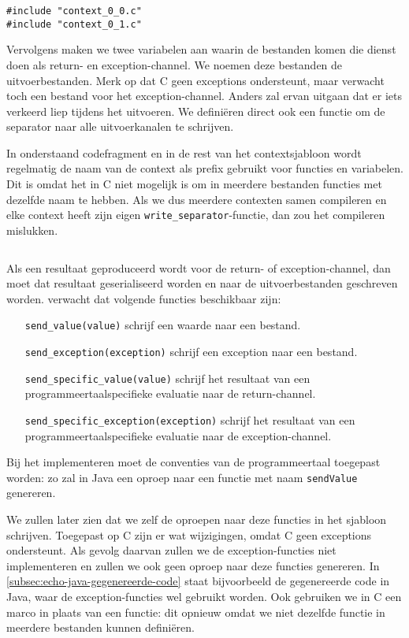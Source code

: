 \begin{verbatim}
#include "context_0_0.c"
#include "context_0_1.c"
\end{verbatim}

Vervolgens maken we twee variabelen aan waarin de bestanden komen die dienst doen als return- en exception-channel.
We noemen deze bestanden de uitvoerbestanden.
Merk op dat C geen exceptions ondersteunt, maar \tested{} verwacht toch een bestand voor het exception-channel.
Anders zal \tested{} ervan uitgaan dat er iets verkeerd liep tijdens het uitvoeren.
We definiëren direct ook een functie om de separator naar alle uitvoerkanalen te schrijven.

In onderstaand codefragment en in de rest van het contextsjabloon wordt regelmatig de naam van de context als prefix gebruikt voor functies en variabelen.
Dit is omdat het in C niet mogelijk is om in meerdere bestanden functies met dezelfde naam te hebben.
Als we dus meerdere contexten samen compileren en elke context heeft zijn eigen \texttt{write\_separator}-functie, dan zou het compileren mislukken.

\inputminted[firstline=13,lastline=21]{mako}{sources/c-context.mako}

Als een resultaat geproduceerd wordt voor de return- of exception-channel, dan moet dat resultaat geserialiseerd worden en naar de uitvoerbestanden geschreven worden.
\tested{} verwacht dat volgende functies beschikbaar zijn:

\begin{itemize}
    \item[\texttt{send\_value(value)}] schrijf een waarde naar een bestand.
    \item[\texttt{send\_exception(exception)}] schrijf een exception naar een bestand.
    \item[\texttt{send\_specific\_value(value)}] schrijf het resultaat van een programmeertaalspecifieke evaluatie naar de return-channel.
    \item[\texttt{send\_specific\_exception(exception)}] schrijf het resultaat van een programmeertaalspecifieke evaluatie naar de exception-channel.
\end{itemize}

Bij het implementeren moet de conventies van de programmeertaal toegepast worden: zo zal \tested{} in Java een oproep naar een functie met naam \texttt{sendValue} genereren.

We zullen later zien dat we zelf de oproepen naar deze functies in het sjabloon schrijven.
Toegepast op C zijn er wat wijzigingen, omdat C geen exceptions ondersteunt.
Als gevolg daarvan zullen we de exception-functies niet implementeren en zullen we ook geen oproep naar deze functies genereren.
In \cref{subsec:echo-java-gegenereerde-code} staat bijvoorbeeld de gegenereerde code in Java, waar de exception-functies wel gebruikt worden.
Ook gebruiken we in C een marco in plaats van een functie: dit opnieuw omdat we niet dezelfde functie in meerdere bestanden kunnen definiëren.

